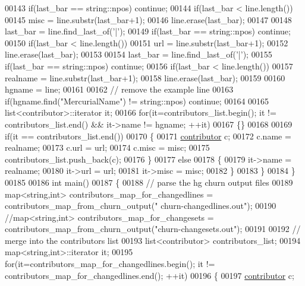 \begin{DoxyCode}
00143     \textcolor{keywordflow}{if}(last\_bar == string::npos) \textcolor{keywordflow}{continue};
00144     \textcolor{keywordflow}{if}(last\_bar < line.length())
00145       misc = line.substr(last\_bar+1);
00146     line.erase(last\_bar);
00147     
00148     last\_bar = line.find\_last\_of(\textcolor{charliteral}{'|'});
00149     \textcolor{keywordflow}{if}(last\_bar == string::npos) \textcolor{keywordflow}{continue};
00150     \textcolor{keywordflow}{if}(last\_bar < line.length())
00151       url = line.substr(last\_bar+1);
00152     line.erase(last\_bar);
00153 
00154     last\_bar = line.find\_last\_of(\textcolor{charliteral}{'|'});
00155     \textcolor{keywordflow}{if}(last\_bar == string::npos) \textcolor{keywordflow}{continue};
00156     \textcolor{keywordflow}{if}(last\_bar < line.length())
00157       realname = line.substr(last\_bar+1);
00158     line.erase(last\_bar);
00159 
00160     hgname = line;
00161     
00162     \textcolor{comment}{// remove the example line}
00163     \textcolor{keywordflow}{if}(hgname.find(\textcolor{stringliteral}{"MercurialName"}) != string::npos) \textcolor{keywordflow}{continue};
00164     
00165     list<contributor>::iterator it;
00166     \textcolor{keywordflow}{for}(it=contributors\_list.begin(); it != contributors\_list.end() && it->name != hgname; ++it)
00167     \{\}
00168     
00169     \textcolor{keywordflow}{if}(it == contributors\_list.end())
00170     \{
00171       \hyperlink{structcontributor}{contributor} c;
00172       c.name = realname;
00173       c.url = url;
00174       c.misc = misc;
00175       contributors\_list.push\_back(c);
00176     \}
00177     \textcolor{keywordflow}{else}
00178     \{
00179       it->name = realname;
00180       it->url = url;
00181       it->misc = misc;
00182     \}
00183   \}
00184 \}
00185 
00186 \textcolor{keywordtype}{int} main()
00187 \{
00188   \textcolor{comment}{// parse the hg churn output files}
00189   map<string,int> contributors\_map\_for\_changedlines = contributors\_map\_from\_churn\_output(\textcolor{stringliteral}{"
      churn-changedlines.out"});
00190   \textcolor{comment}{//map<string,int> contributors\_map\_for\_changesets =
       contributors\_map\_from\_churn\_output("churn-changesets.out");}
00191   
00192   \textcolor{comment}{// merge into the contributors list}
00193   list<contributor> contributors\_list;
00194   map<string,int>::iterator it;
00195   \textcolor{keywordflow}{for}(it=contributors\_map\_for\_changedlines.begin(); it != contributors\_map\_for\_changedlines.end(); ++it)
00196   \{
00197     \hyperlink{structcontributor}{contributor} c;

\end{DoxyCode}
